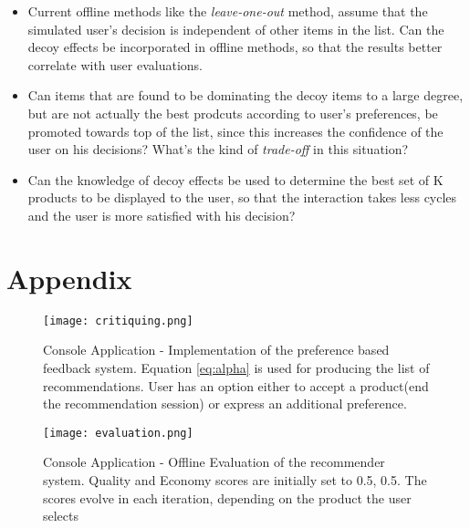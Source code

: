 \documentclass{llncs}
\begin{document}
\begin{itemize}
\item Current offline methods like the \textit{leave-one-out} method, assume that the simulated user's decision is independent of other items in the list. 
Can the decoy effects be incorporated in offline methods, so that the results better correlate with user evaluations.

\item Can items that are found to be dominating the decoy items to a large degree, but are not actually the best prodcuts according to user's preferences, be promoted towards top of the list, since this increases the confidence of the user on his decisions? What's the kind of \textit{trade-off} in this situation?

\item Can the knowledge of decoy effects be used to determine the best set of K products to be displayed to the user, so that the interaction takes less cycles and the user is more satisfied with his decision?

\end{itemize}

\nocite {shani, ariely, viappiani, simonson,teppan, felfernig, zhang, reilly, jannach, reilly2007evaluating, reilly2004explaining} 



\section{Appendix}
\label {sec:appendix}
\begin{figure}[h]
  \caption{Console Application - Implementation of the preference based feedback system.
Equation \ref{eq:alpha} is used for producing the list of recommendations. User has an option either to accept a product(end the recommendation session) or express an additional preference.}
  \centering
    \texttt{[image: critiquing.png]}
\end{figure}

\begin{figure}
  \caption{Console Application - Offline Evaluation of the recommender system. Quality and Economy scores are initially set to 0.5, 0.5. The scores evolve in each iteration, depending on the product the user selects}
  \centering
    \texttt{[image: evaluation.png]}
\end{figure}
\end{document}
